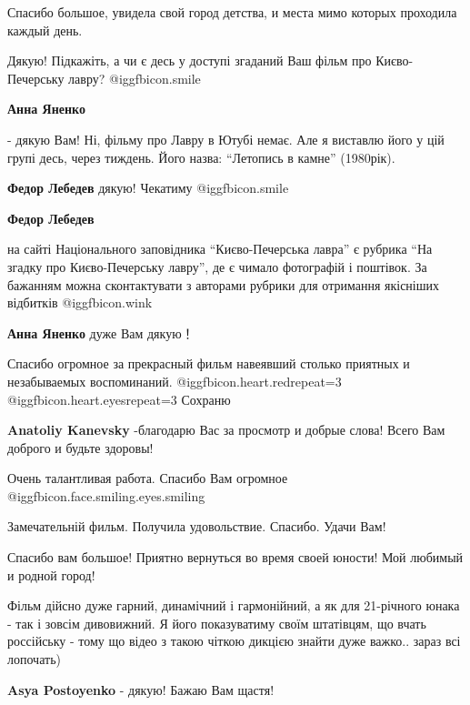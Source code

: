 \begin{itemize}
Спасибо большое, увидела свой город детства, и места мимо которых проходила каждый день.

Дякую! Підкажіть, а чи є десь у доступі згаданий Ваш фільм про Києво-Печерську
лавру?  @igg{fbicon.smile} 

\begin{itemize} %
\textbf{Анна Яненко} 

- дякую Вам! Ні, фільму про Лавру в Ютубі немає. Але я виставлю його у цій
групі десь, через тиждень. Його назва: \enquote{Летопись в камне} (1980рік).

\textbf{Федор Лебедев} дякую! Чекатиму  @igg{fbicon.smile} 

\textbf{Федор Лебедев} 

на сайті Національного заповідника \enquote{Києво-Печерська лавра} є рубрика \enquote{На згадку
про Києво-Печерську лавру}, де є чимало фотографій і поштівок. За бажанням
можна сконтактувати з авторами рубрики для отримання якісніших відбитків  @igg{fbicon.wink} 

\textbf{Анна Яненко} дуже Вам дякую！
\end{itemize} %

Спасибо огромное за прекрасный фильм навеявший столько приятных и незабываемых воспоминаний. @igg{fbicon.heart.red}{repeat=3}  @igg{fbicon.heart.eyes}{repeat=3}  Сохраню

\textbf{Anatoliy Kanevsky} -благодарю Вас за просмотр и добрые слова! Всего Вам доброго и будьте здоровы!

Очень талантливая работа. Спасибо Вам огромное  @igg{fbicon.face.smiling.eyes.smiling} 

Замечательній фильм. Получила удовольствие. Спасибо. Удачи Вам!

Спасибо вам большое! Приятно вернуться во время своей юности! Мой любимый и родной город!


Фільм дійсно дуже гарний, динамічний і гармонійний, а як для 21-річного юнака -
так і зовсім дивовижний. Я його показуватиму своїм штатівцям, що вчать
россійську - тому що відео з такою чіткою дикцією знайти дуже важко.. зараз всі
лопочать)

\textbf{Asya Postoyenko} - дякую! Бажаю Вам щастя!


\end{itemize}

